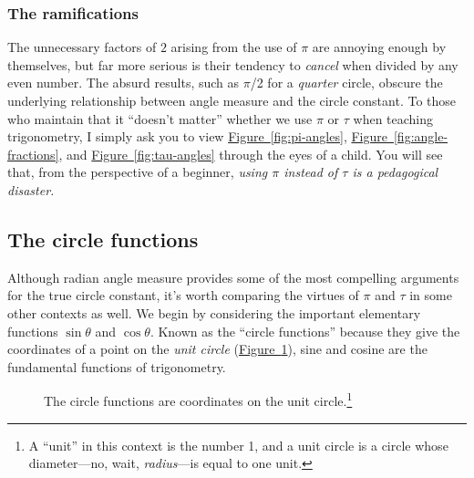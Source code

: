 \documentclass{article}
\begin{document}
    \subsubsection{The ramifications} %
    \label{sec:the_ramifications}
    

The unnecessary factors of $2$ arising from the use of $\pi$ are annoying enough by themselves, but far more serious is their tendency to \emph{cancel} when divided by any even number. The absurd results, such as $\pi$/2 for a \emph{quarter} circle, obscure the underlying relationship between angle measure and the circle constant. To those who maintain that it ``doesn't matter'' whether we use $\pi$ or $\tau$ when teaching trigonometry, I simply ask you to view \hyperref[fig:pi-angles]{Figure~}\ref{fig:pi-angles}, \hyperref[fig:angle-fractions]{Figure~}\ref{fig:angle-fractions}, and \hyperref[fig:tau-angles]{Figure~}\ref{fig:tau-angles} through the eyes of a child. You will see that, from the perspective of a beginner, \emph{using $\pi$ instead of $\tau$ is a pedagogical disaster.}

  \subsection{The circle functions} %
  \label{sec:the_circle_functions}

Although radian angle measure provides some of the most compelling arguments for the true circle constant, it's worth comparing the virtues of $\pi$ and $\tau$ in some other contexts as well. We begin by considering the important elementary functions $\sin\theta$ and $\cos\theta$. Known as the ``circle functions''  because they give the coordinates of a point on the \emph{unit circle} (\hyperref[fig:circle-functions]{Figure~}\ref{fig:circle-functions}), sine and cosine are the fundamental functions of trigonometry.

\begin{figure}
\begin{center}
\end{center}
\caption{The circle functions are coordinates on the unit circle.\footnote{A ``unit'' in this context is the number 1, and a unit circle is a circle whose diameter---no, wait, \emph{radius}---is equal to one unit.}\label{fig:circle-functions}}
\end{figure}
\end{document}
